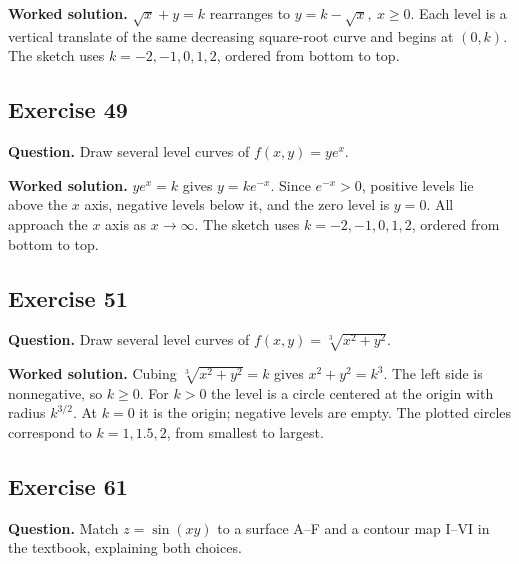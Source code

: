 \documentclass[11pt]{article}
\newcommand{\ex}[1]{\Needspace{8\baselineskip}\subsection*{Exercise #1}}
\newcommand{\ans}[1]{\boxed{#1}}
\begin{document}
\textbf{Worked solution.}
$\sqrt{x}+y=k$ rearranges to $\ans{y=k-\sqrt{x},\ x\ge0}$. Each level is a vertical translate of the same decreasing square-root curve and begins at $(0,k)$. The sketch uses $k=-2,-1,0,1,2$, ordered from bottom to top.
\begin{center}\end{center}
\ex{49}
\textbf{Question.} Draw several level curves of $f(x,y)=ye^x$.

\textbf{Worked solution.}
$ye^x=k$ gives $\ans{y=ke^{-x}}$. Since $e^{-x}>0$, positive levels lie above the $x$ axis, negative levels below it, and the zero level is $y=0$. All approach the $x$ axis as $x\to\infty$. The sketch uses $k=-2,-1,0,1,2$, ordered from bottom to top.
\begin{center}\end{center}
\ex{51}
\textbf{Question.} Draw several level curves of $f(x,y)=\sqrt[3]{x^2+y^2}$.

\textbf{Worked solution.}
Cubing $\sqrt[3]{x^2+y^2}=k$ gives $x^2+y^2=k^3$. The left side is nonnegative, so $k\ge0$. For $k>0$ the level is a circle centered at the origin with radius $\ans{k^{3/2}}$. At $k=0$ it is the origin; negative levels are empty. The plotted circles correspond to $k=1,1.5,2$, from smallest to largest.
\begin{center}\end{center}
\ex{61}
\textbf{Question.} Match $z=\sin(xy)$ to a surface A--F and a contour map I--VI in the textbook, explaining both choices.
\end{document}
